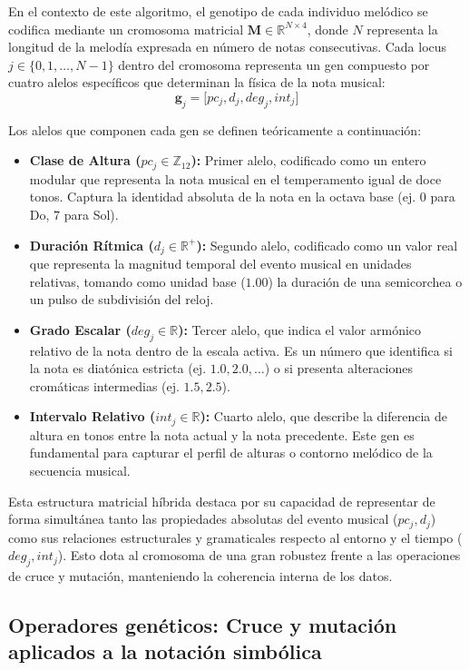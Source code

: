 En el contexto de este algoritmo, el genotipo de cada individuo melódico se codifica mediante un cromosoma matricial $\mathbf{M} \in \mathbb{R}^{N \times 4}$, donde $N$ representa la longitud de la melodía expresada en número de notas consecutivas. Cada locus $j \in \{0, 1, \dots, N-1\}$ dentro del cromosoma representa un gen compuesto por cuatro alelos específicos que determinan la física de la nota musical:
\begin{equation}
    \mathbf{g}_j = \big[ pc_j, d_j, deg_j, int_j \big]
\end{equation}

Los alelos que componen cada gen se definen teóricamente a continuación:
\begin{itemize}
    \item \textbf{Clase de Altura ($pc_j \in \mathbb{Z}_{12}$):} Primer alelo, codificado como un entero modular que representa la nota musical en el temperamento igual de doce tonos. Captura la identidad absoluta de la nota en la octava base (ej. $0$ para Do, $7$ para Sol).
    \item \textbf{Duración Rítmica ($d_j \in \mathbb{R}^+$):} Segundo alelo, codificado como un valor real que representa la magnitud temporal del evento musical en unidades relativas, tomando como unidad base ($1.00$) la duración de una semicorchea o un pulso de subdivisión del reloj.
    \item \textbf{Grado Escalar ($deg_j \in \mathbb{R}$):} Tercer alelo, que indica el valor armónico relativo de la nota dentro de la escala activa. Es un número que identifica si la nota es diatónica estricta (ej. $1.0, 2.0, \dots$) o si presenta alteraciones cromáticas intermedias (ej. $1.5, 2.5$).
    \item \textbf{Intervalo Relativo ($int_j \in \mathbb{R}$):} Cuarto alelo, que describe la diferencia de altura en tonos entre la nota actual y la nota precedente. Este gen es fundamental para capturar el perfil de alturas o contorno melódico de la secuencia musical.
\end{itemize}

Esta estructura matricial híbrida destaca por su capacidad de representar de forma simultánea tanto las propiedades absolutas del evento musical ($pc_j, d_j$) como sus relaciones estructurales y gramaticales respecto al entorno y el tiempo ($deg_j, int_j$). Esto dota al cromosoma de una gran robustez frente a las operaciones de cruce y mutación, manteniendo la coherencia interna de los datos.

\subsection{Operadores genéticos: Cruce y mutación aplicados a la notación simbólica}

